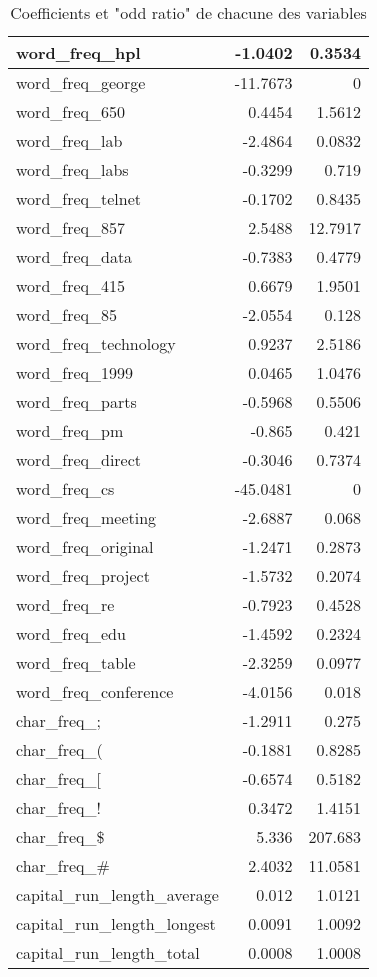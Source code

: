 \begin{homeworkProblem}
\begin{homeworkSection}{2.1}
\begin{table}[htbp]
\begin{center}
\begin{tabular}{|l|r|r|}
				word\_freq\_hpl & -1.0402 & 0.3534 \\ \hline
				word\_freq\_george & -11.7673 & 0 \\ \hline
				word\_freq\_650 & 0.4454 & 1.5612 \\ \hline
				word\_freq\_lab & -2.4864 & 0.0832 \\ \hline
				word\_freq\_labs & -0.3299 & 0.719 \\ \hline
				word\_freq\_telnet & -0.1702 & 0.8435 \\ \hline
				word\_freq\_857 & 2.5488 & 12.7917 \\ \hline
				word\_freq\_data & -0.7383 & 0.4779 \\ \hline
				word\_freq\_415 & 0.6679 & 1.9501 \\ \hline
				word\_freq\_85 & -2.0554 & 0.128 \\ \hline
				word\_freq\_technology & 0.9237 & 2.5186 \\ \hline
				word\_freq\_1999 & 0.0465 & 1.0476 \\ \hline
				word\_freq\_parts & -0.5968 & 0.5506 \\ \hline
				word\_freq\_pm & -0.865 & 0.421 \\ \hline
				word\_freq\_direct & -0.3046 & 0.7374 \\ \hline
				word\_freq\_cs & -45.0481 & 0 \\ \hline
				word\_freq\_meeting & -2.6887 & 0.068 \\ \hline
				word\_freq\_original & -1.2471 & 0.2873 \\ \hline
				word\_freq\_project & -1.5732 & 0.2074 \\ \hline
				word\_freq\_re & -0.7923 & 0.4528 \\ \hline
				word\_freq\_edu & -1.4592 & 0.2324 \\ \hline
				word\_freq\_table & -2.3259 & 0.0977 \\ \hline
				word\_freq\_conference & -4.0156 & 0.018 \\ \hline
				char\_freq\_; & -1.2911 & 0.275 \\ \hline
				char\_freq\_( & -0.1881 & 0.8285 \\ \hline
				char\_freq\_[ & -0.6574 & 0.5182 \\ \hline
				char\_freq\_! & 0.3472 & 1.4151 \\ \hline
				char\_freq\_\$ & 5.336 & 207.683 \\ \hline
				char\_freq\_\# & 2.4032 & 11.0581 \\ \hline
				capital\_run\_length\_average & 0.012 & 1.0121 \\ \hline
				capital\_run\_length\_longest & 0.0091 & 1.0092 \\ \hline
				capital\_run\_length\_total & 0.0008 & 1.0008 \\ \hline
			\end{tabular}
			\end{center}
			\caption{Coefficients et "odd ratio" de chacune des variables}
			\label{coefs}
			\end{table}
			

\end{homeworkSection}
\end{homeworkProblem}
